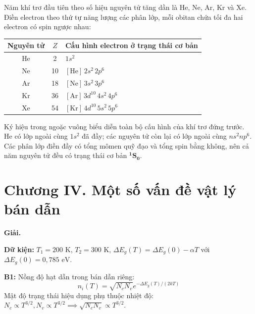 \documentclass[11pt,a4paper]{article}
\renewcommand{\boldsymbol}[1]{\symbf{#1}}
\let\DeBaiOriginal\DeBai
\renewcommand{\DeBai}[1]{\par\Needspace{5\baselineskip}\DeBaiOriginal{#1}}
\begin{document}
Năm khí trơ đầu tiên theo số hiệu nguyên tử tăng dần là He, Ne, Ar, Kr và Xe.
Điền electron theo thứ tự năng lượng các phân lớp, mỗi obitan chứa tối đa
hai electron có spin ngược nhau:
\begin{center}
\begin{tabular}{ccl}
\hline
Nguyên tử & $Z$ & Cấu hình electron ở trạng thái cơ bản \\
\hline
He & 2  & $1s^2$ \\
Ne & 10 & $[\mathrm{He}]\,2s^2\,2p^6$ \\
Ar & 18 & $[\mathrm{Ne}]\,3s^2\,3p^6$ \\
Kr & 36 & $[\mathrm{Ar}]\,3d^{10}\,4s^2\,4p^6$ \\
Xe & 54 & $[\mathrm{Kr}]\,4d^{10}\,5s^2\,5p^6$ \\
\hline
\end{tabular}
\end{center}
Ký hiệu trong ngoặc vuông biểu diễn toàn bộ cấu hình của khí trơ đứng trước.
He có lớp ngoài cùng $1s^2$ đã đầy; các nguyên tử còn lại có lớp ngoài cùng $ns^2np^6$.
Các phân lớp điền đầy có tổng mômen quỹ đạo và tổng spin bằng không,
nên cả năm nguyên tử đều có trạng thái cơ bản $\boldsymbol{{}^1S_0}$.

\clearpage
\section*{Chương IV. Một số vấn đề vật lý bán dẫn}


\textbf{Giải.}

\textbf{Dữ kiện:} $T_1 = 200\text{ K}$, $T_2 = 300\text{ K}$, $\Delta E_g(T) = \Delta E_g(0) - \alpha T$ với $\Delta E_g(0) = 0{,}785\text{ eV}$.

\textbf{B1:} Nồng độ hạt dẫn trong bán dẫn riêng:
\begin{equation*}
    n_i(T) = \sqrt{N_c N_v} e^{-\Delta E_g(T)/(2kT)}
\end{equation*}
Mật độ trạng thái hiệu dụng phụ thuộc nhiệt độ: $N_c \propto T^{3/2}, N_v \propto T^{3/2} \implies \sqrt{N_c N_v} \propto T^{3/2}$.
\end{document}
